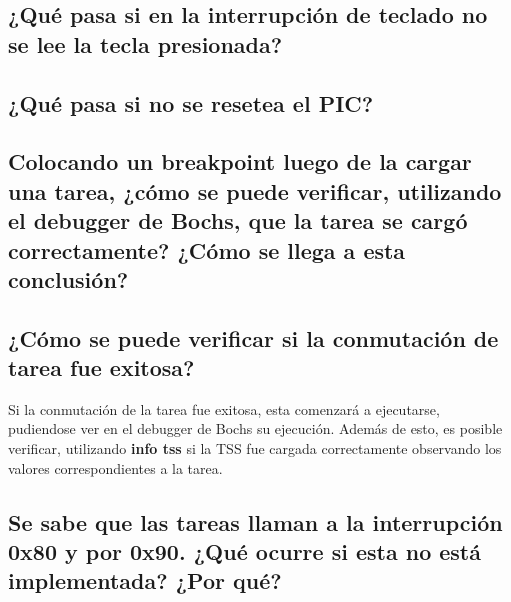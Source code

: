 \documentclass[a4paper,10pt,twoside]{article}
\begin{document}
\subsection{¿Qué pasa si en la interrupción de teclado no se lee la tecla presionada?}

\subsection{¿Qué pasa si no se resetea el PIC?}

\subsection{Colocando un breakpoint luego de la cargar una tarea, ¿cómo se puede
verificar, utilizando el debugger de Bochs, que la tarea se cargó correctamente? ¿Cómo se
llega a esta conclusión?}

\subsection{¿Cómo se puede verificar si la conmutación de tarea fue exitosa?}
Si la conmutación de la tarea fue exitosa, esta comenzará a ejecutarse, pudiendose ver en el debugger de Bochs su ejecución. Además de esto, es posible verificar, utilizando \textbf{info tss} si la TSS fue cargada correctamente observando los valores correspondientes a la tarea.

\subsection{Se sabe que las tareas llaman a la interrupción 0x80 y por 0x90. ¿Qué ocurre si esta no está implementada? ¿Por qué?}
\end{document}
